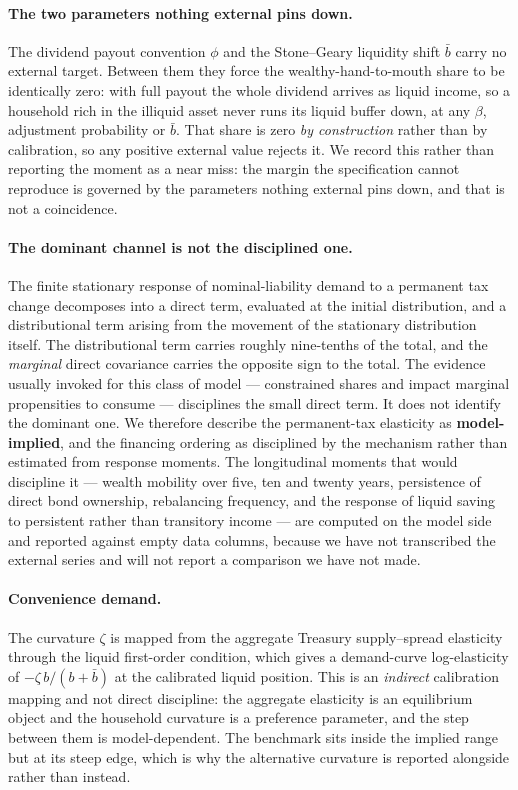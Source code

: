 \documentclass[12pt]{article}
\begin{document}
\paragraph{The two parameters nothing external pins down.} The dividend
payout convention $\phi$ and the Stone--Geary liquidity shift $\bar b$ carry
no external target. Between them they force the wealthy-hand-to-mouth share
to be identically zero: with full payout the whole dividend arrives as liquid
income, so a household rich in the illiquid asset never runs its liquid
buffer down, at any $\beta$, adjustment probability or $\bar b$. That share is
zero \emph{by construction} rather than by calibration, so any positive
external value rejects it. We record this rather than reporting the moment as
a near miss: the margin the specification cannot reproduce is governed by the
parameters nothing external pins down, and that is not a coincidence.

\paragraph{The dominant channel is not the disciplined one.} The finite
stationary response of nominal-liability demand to a permanent tax change
decomposes into a direct term, evaluated at the initial distribution, and a
distributional term arising from the movement of the stationary distribution
itself. The distributional term carries roughly nine-tenths of the total, and
the \emph{marginal} direct covariance carries the opposite sign to the total.
The evidence usually invoked for this class of model --- constrained shares
and impact marginal propensities to consume --- disciplines the small direct
term. It does not identify the dominant one. We therefore describe the
permanent-tax elasticity as \textbf{model-implied}, and the financing
ordering as disciplined by the mechanism rather than estimated from response
moments. The longitudinal moments that would discipline it --- wealth
mobility over five, ten and twenty years, persistence of direct bond
ownership, rebalancing frequency, and the response of liquid saving to
persistent rather than transitory income --- are computed on the model side
and reported against empty data columns, because we have not transcribed the
external series and will not report a comparison we have not made.

\paragraph{Convenience demand.} The curvature $\zeta$ is mapped from the
aggregate Treasury supply--spread elasticity through the liquid first-order
condition, which gives a demand-curve log-elasticity of
$-\zeta\,b/(b+\bar b)$ at the calibrated liquid position. This is an
\emph{indirect} calibration mapping and not direct discipline: the aggregate
elasticity is an equilibrium object and the household curvature is a
preference parameter, and the step between them is model-dependent. The
benchmark sits inside the implied range but at its steep edge, which is why
the alternative curvature is reported alongside rather than instead.
\end{document}
